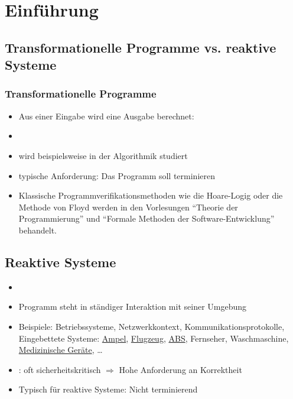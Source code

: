 \section{Einführung}
\label{sec:para1}
\nextlecture
\subsection*{Transformationelle Programme vs. reaktive Systeme}
\subsubsection*{Transformationelle Programme}
\begin{itemize}
	\item Aus einer Eingabe wird eine Ausgabe berechnet:
	\item[] 
	\item wird beispielsweise in der Algorithmik studiert
	\item typische Anforderung: Das Programm soll terminieren
	\item Klassische Programmverifikationsmethoden wie die Hoare-Logig oder die Methode von Floyd werden in den Vorlesungen \enquote{Theorie der Programmierung} und \enquote{Formale Methoden der Software-Entwicklung} behandelt.
\end{itemize}

\subsection*{Reaktive Systeme}
\begin{itemize}
	\item[] 
	\item Programm steht in ständiger Interaktion mit seiner Umgebung
	\item Beispiele: Betriebssysteme, Netzwerkkontext, Kommunikationsprotokolle, Eingebettete Systeme: \underline{Ampel}, \underline{Flugzeug}, \underline{ABS}, Fernseher, Waschmaschine, \underline{Medizinische Geräte}, \dots
	\item[] \textunderscore: oft sicherheitskritisch $\Rightarrow$ Hohe Anforderung an Korrektheit
	\item Typisch für reaktive Systeme: Nicht terminierend
\end{itemize}


